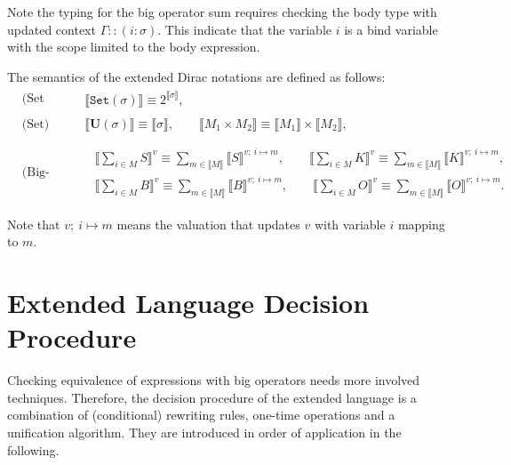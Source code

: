 \documentclass[manuscript, review, timestamp]{acmart}
\newcommand*{\reduce}{\ \triangleright\ }
\newcommand*{\sem}[1]{{\llbracket #1 \rrbracket}}
\begin{document}
Note the typing for the big operator sum requires checking the body type with updated context $\Gamma :: (i : \sigma)$. This indicate that the variable $i$ is a bind variable with the scope limited to the body expression. 

\begin{definition}
  The semantics of the extended Dirac notations are defined as follows:
  \begin{align*}
    & \text{(Set Types)} && \begin{aligned}
      \sem{\texttt{Set}(\sigma)} \equiv 2^{\sem{\sigma}},
    \end{aligned} \\
    & \text{(Set)} && \begin{aligned}
      \sem{\mathbf{U}(\sigma)} \equiv \sem{\sigma},
      \qquad
      \sem{M_1 \times M_2} \equiv \sem{M_1} \times \sem{M_2},
    \end{aligned} \\
    \\
    & \text{(Big-op)} && \begin{aligned}
      & \sem{\sum_{i \in M} S}^v \equiv \sum_{m \in \sem{M}} \sem{S}^{v;\ i\mapsto m},
      \qquad
      \sem{\sum_{i \in M} K}^v \equiv \sum_{m \in \sem{M}} \sem{K}^{v;\ i\mapsto m},
      \\
      & \sem{\sum_{i \in M} B}^v \equiv \sum_{m \in \sem{M}} \sem{B}^{v;\ i\mapsto m},
      \qquad
      \sem{\sum_{i \in M} O}^v \equiv \sum_{m \in \sem{M}} \sem{O}^{v;\ i\mapsto m}.
    \end{aligned}
  \end{align*}
\end{definition}

Note that $v;\ i \mapsto m$ means the valuation that updates $v$ with variable $i$ mapping to $m$.

\section{Extended Language Decision Procedure}
Checking equivalence of expressions with big operators needs more involved techniques. 
Therefore, the decision procedure of the extended language is a combination of (conditional) rewriting rules, one-time operations and a unification algorithm. They are introduced in order of application in the following.

\end{document}
